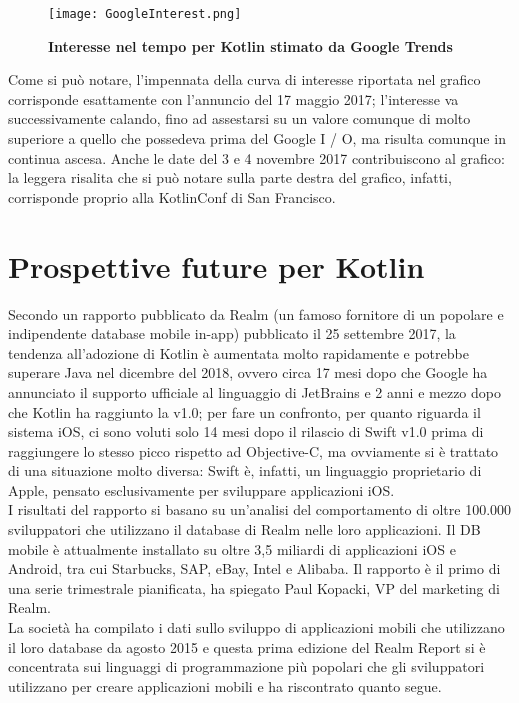 \begin{figure}[ht]
  \centering
  \texttt{[image: GoogleInterest.png]}
  \caption{{\bfseries Interesse nel tempo per Kotlin stimato da Google Trends}}
  \label{GoogleInterest}
\end{figure}

Come si può notare, l'impennata della curva di interesse riportata nel grafico corrisponde esattamente con l'annuncio del 17 maggio 2017; l'interesse va successivamente calando, fino ad assestarsi su un valore comunque di molto superiore a quello che possedeva prima del Google I / O, ma risulta comunque in continua ascesa. Anche le date del 3 e 4 novembre 2017 contribuiscono al grafico: la leggera risalita che si può notare sulla parte destra del grafico, infatti, corrisponde proprio alla KotlinConf di San Francisco.

\section{Prospettive future per Kotlin}

Secondo un rapporto \cite{realmReport} pubblicato da Realm \cite{realm} (un famoso fornitore di un popolare e indipendente database mobile in-app) pubblicato il 25 settembre 2017, la tendenza all'adozione di Kotlin è aumentata molto rapidamente e potrebbe superare Java nel dicembre del 2018, ovvero circa 17 mesi dopo che Google ha annunciato il supporto ufficiale al linguaggio di JetBrains e 2 anni e mezzo dopo che Kotlin ha raggiunto la v1.0; per fare un confronto, per quanto riguarda il sistema iOS, ci sono voluti solo 14 mesi dopo il rilascio di Swift v1.0 prima di raggiungere lo stesso picco rispetto ad Objective-C, ma ovviamente si è trattato di una situazione molto diversa: Swift è, infatti, un linguaggio proprietario di Apple, pensato esclusivamente per sviluppare applicazioni iOS.\\

I risultati del rapporto si basano su un'analisi del comportamento di oltre 100.000 sviluppatori che utilizzano il database di Realm nelle loro applicazioni. Il DB mobile è attualmente installato su oltre 3,5 miliardi di applicazioni iOS e Android, tra cui Starbucks, SAP, eBay, Intel e Alibaba. Il rapporto è il primo di una serie trimestrale pianificata, ha spiegato Paul Kopacki, VP del marketing di Realm.\\
La società ha compilato i dati sullo sviluppo di applicazioni mobili che utilizzano il loro database da agosto 2015 e questa prima edizione del Realm Report si è concentrata sui linguaggi di programmazione più popolari che gli sviluppatori utilizzano per creare applicazioni mobili e ha riscontrato quanto segue.\\

